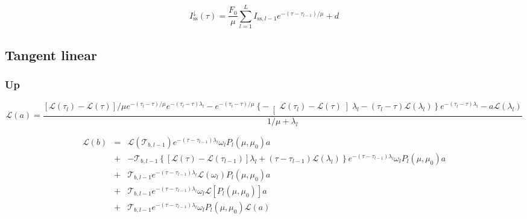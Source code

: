 \begin{equation}
I^{\downarrow}_{\mathrm{ss}}(\tau) = \frac{F_{0}}{\mu} \sum^{L}_{l = 1} I_{\mathrm{ss},l - 1} e^{-(\tau - \tau_{l-1}) / \mu} + d
\label{eq:single_scattering-forward-down-I_down-ss}
\end{equation}


%
\subsection{Tangent linear}
\label{sec:single_scattering-tangent_linear}

\subsubsection{Up}
\label{sec:single_scattering-tangent_linear-up}

\begin{adjustwidth}{-1in}{-1in}
\center
\begin{equation}
\mathcal{L}(a) = \frac{\left[\mathcal{L}(\tau_{l}) - \mathcal{L}(\tau)\right] / \mu e^{-(\tau_{l} - \tau) / \mu}e^{-(\tau_{l} - \tau) \lambda_{l}} - e^{- (\tau_{l} - \tau) / \mu} \left\{-\right[\mathcal{L}(\tau_{l}) - \mathcal{L}(\tau)\left]\lambda_{l} - (\tau_{l} - \tau)\mathcal{L}(\lambda_{l})\right\} e^{- (\tau_{l} - \tau) \lambda_{l}} - a \mathcal{L}(\lambda_{l})}{1/\mu + \lambda_{l}}
\label{eq:single_scattering-tangent_linear-up-a_l}
\end{equation}
\end{adjustwidth}

\begin{eqnarray}
\mathcal{L}(b) & = & \mathcal{L}(\mathcal{T}_{b,l-1}) e^{-(\tau - \tau_{l-1}) \lambda_{l}} \omega_{l} P_{l}(\mu, \mu_0) a \\
               & + & - \mathcal{T}_{b,l-1} \left\{\left[\mathcal{L}(\tau) - \mathcal{L}(\tau_{l-1})\right] \lambda_{l} + (\tau - \tau_{l-1}) \mathcal{L}(\lambda_{l})\right\} e^{-(\tau - \tau_{l-1}) \lambda_{l}} \omega_{l} P_{l}(\mu, \mu_0) a \nonumber \\
               & + & \mathcal{T}_{b,l-1} e^{-(\tau - \tau_{l-1}) \lambda_{l}} \mathcal{L}(\omega_{l}) P_{l}(\mu, \mu_0) a \nonumber \\
               & + & \mathcal{T}_{b,l-1} e^{-(\tau - \tau_{l-1}) \lambda_{l}} \omega_{l} \mathcal{L}\left[P_{l}(\mu, \mu_0)\right] a \nonumber \\
               & + & \mathcal{T}_{b,l-1} e^{-(\tau - \tau_{l-1}) \lambda_{l}} \omega_{l} P_{l}(\mu, \mu_0) \mathcal{L}(a) \nonumber
\label{eq:single_scattering-tangent_linear-up-b_l}
\end{eqnarray}


